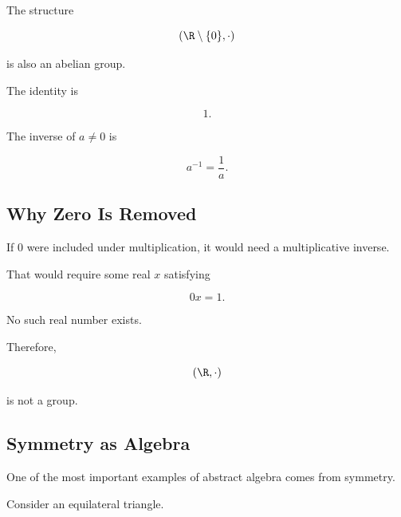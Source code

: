 The structure

\[ (\R\setminus\{0\},\cdot) \]

is also an abelian group.

The identity is

\[ 1. \]

The inverse of \(a\neq0\) is

\[ a^{-1}=\frac1a. \]

\subsection{Why Zero Is Removed}
\label{subsec:why-zero-removed}

If \(0\) were included under multiplication, it would need a multiplicative
inverse.

That would require some real \(x\) satisfying

\[ 0x=1. \]

No such real number exists.

Therefore,

\[ (\R,\cdot) \]

is not a group.

\subsection{Symmetry as Algebra}
\label{subsec:symmetry-as-algebra}

One of the most important examples of abstract algebra comes from symmetry.

Consider an equilateral triangle.

\begin{center}
\end{center}

